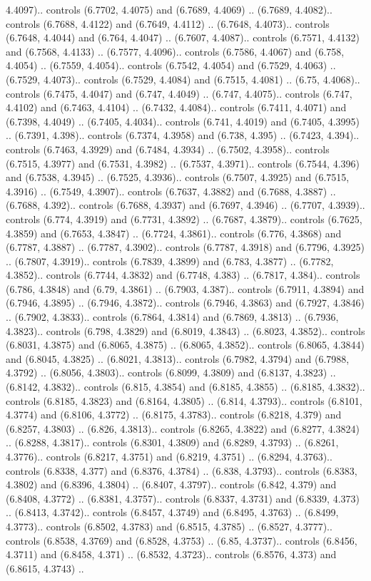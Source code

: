 4.4097).. controls (6.7702, 4.4075) and (6.7689, 4.4069) .. (6.7689, 4.4082).. controls (6.7688, 4.4122) and (6.7649, 4.4112) .. (6.7648, 4.4073).. controls (6.7648, 4.4044) and (6.764, 4.4047) .. (6.7607, 4.4087).. controls (6.7571, 4.4132) and (6.7568, 4.4133) .. (6.7577, 4.4096).. controls (6.7586, 4.4067) and (6.758, 4.4054) .. (6.7559, 4.4054).. controls (6.7542, 4.4054) and (6.7529, 4.4063) .. (6.7529, 4.4073).. controls (6.7529, 4.4084) and (6.7515, 4.4081) .. (6.75, 4.4068).. controls (6.7475, 4.4047) and (6.747, 4.4049) .. (6.747, 4.4075).. controls (6.747, 4.4102) and (6.7463, 4.4104) .. (6.7432, 4.4084).. controls (6.7411, 4.4071) and (6.7398, 4.4049) .. (6.7405, 4.4034).. controls (6.741, 4.4019) and (6.7405, 4.3995) .. (6.7391, 4.398).. controls (6.7374, 4.3958) and (6.738, 4.395) .. (6.7423, 4.394).. controls (6.7463, 4.3929) and (6.7484, 4.3934) .. (6.7502, 4.3958).. controls (6.7515, 4.3977) and (6.7531, 4.3982) .. (6.7537, 4.3971).. controls (6.7544, 4.396) and (6.7538, 4.3945) .. (6.7525, 4.3936).. controls (6.7507, 4.3925) and (6.7515, 4.3916) .. (6.7549, 4.3907).. controls (6.7637, 4.3882) and (6.7688, 4.3887) .. (6.7688, 4.392).. controls (6.7688, 4.3937) and (6.7697, 4.3946) .. (6.7707, 4.3939).. controls (6.774, 4.3919) and (6.7731, 4.3892) .. (6.7687, 4.3879).. controls (6.7625, 4.3859) and (6.7653, 4.3847) .. (6.7724, 4.3861).. controls (6.776, 4.3868) and (6.7787, 4.3887) .. (6.7787, 4.3902).. controls (6.7787, 4.3918) and (6.7796, 4.3925) .. (6.7807, 4.3919).. controls (6.7839, 4.3899) and (6.783, 4.3877) .. (6.7782, 4.3852).. controls (6.7744, 4.3832) and (6.7748, 4.383) .. (6.7817, 4.384).. controls (6.786, 4.3848) and (6.79, 4.3861) .. (6.7903, 4.387).. controls (6.7911, 4.3894) and (6.7946, 4.3895) .. (6.7946, 4.3872).. controls (6.7946, 4.3863) and (6.7927, 4.3846) .. (6.7902, 4.3833).. controls (6.7864, 4.3814) and (6.7869, 4.3813) .. (6.7936, 4.3823).. controls (6.798, 4.3829) and (6.8019, 4.3843) .. (6.8023, 4.3852).. controls (6.8031, 4.3875) and (6.8065, 4.3875) .. (6.8065, 4.3852).. controls (6.8065, 4.3844) and (6.8045, 4.3825) .. (6.8021, 4.3813).. controls (6.7982, 4.3794) and (6.7988, 4.3792) .. (6.8056, 4.3803).. controls (6.8099, 4.3809) and (6.8137, 4.3823) .. (6.8142, 4.3832).. controls (6.815, 4.3854) and (6.8185, 4.3855) .. (6.8185, 4.3832).. controls (6.8185, 4.3823) and (6.8164, 4.3805) .. (6.814, 4.3793).. controls (6.8101, 4.3774) and (6.8106, 4.3772) .. (6.8175, 4.3783).. controls (6.8218, 4.379) and (6.8257, 4.3803) .. (6.826, 4.3813).. controls (6.8265, 4.3822) and (6.8277, 4.3824) .. (6.8288, 4.3817).. controls (6.8301, 4.3809) and (6.8289, 4.3793) .. (6.8261, 4.3776).. controls (6.8217, 4.3751) and (6.8219, 4.3751) .. (6.8294, 4.3763).. controls (6.8338, 4.377) and (6.8376, 4.3784) .. (6.838, 4.3793).. controls (6.8383, 4.3802) and (6.8396, 4.3804) .. (6.8407, 4.3797).. controls (6.842, 4.379) and (6.8408, 4.3772) .. (6.8381, 4.3757).. controls (6.8337, 4.3731) and (6.8339, 4.373) .. (6.8413, 4.3742).. controls (6.8457, 4.3749) and (6.8495, 4.3763) .. (6.8499, 4.3773).. controls (6.8502, 4.3783) and (6.8515, 4.3785) .. (6.8527, 4.3777).. controls (6.8538, 4.3769) and (6.8528, 4.3753) .. (6.85, 4.3737).. controls (6.8456, 4.3711) and (6.8458, 4.371) .. (6.8532, 4.3723).. controls (6.8576, 4.373) and (6.8615, 4.3743) .. 